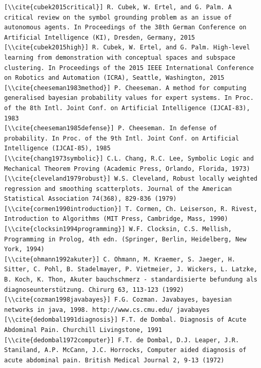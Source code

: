 \documentclass[10pt]{book}
\begin{document}
\begin{verbatim}
[\\cite{cubek2015critical}] R. Cubek, W. Ertel, and G. Palm. A critical review on the symbol grounding problem as an issue of autonomous agents. In Proceedings of the 38th German Conference on Artificial Intelligence (KI), Dresden, Germany, 2015
[\\cite{cubek2015high}] R. Cubek, W. Ertel, and G. Palm. High-level learning from demonstration with conceptual spaces and subspace clustering. In Proceedings of the 2015 IEEE International Conference on Robotics and Automation (ICRA), Seattle, Washington, 2015
[\\cite{cheeseman1983method}] P. Cheeseman. A method for computing generalised bayesian probability values for expert systems. In Proc. of the 8th Intl. Joint Conf. on Artificial Intelligence (IJCAI-83), 1983
[\\cite{cheeseman1985defense}] P. Cheeseman. In defense of probability. In Proc. of the 9th Intl. Joint Conf. on Artificial Intelligence (IJCAI-85), 1985
[\\cite{chang1973symbolic}] C.L. Chang, R.C. Lee, Symbolic Logic and Mechanical Theorem Proving (Academic Press, Orlando, Florida, 1973)
[\\cite{cleveland1979robust}] W.S. Cleveland, Robust locally weighted regression and smoothing scatterplots. Journal of the American Statistical Association 74(368), 829-836 (1979)
[\\cite{cormen1990introduction}] T. Cormen, Ch. Leiserson, R. Rivest, Introduction to Algorithms (MIT Press, Cambridge, Mass, 1990)
[\\cite{clocksin1994programming}] W.F. Clocksin, C.S. Mellish, Programming in Prolog, 4th edn. (Springer, Berlin, Heidelberg, New York, 1994)
[\\cite{ohmann1992akuter}] C. Ohmann, M. Kraemer, S. Jaeger, H. Sitter, C. Pohl, B. Stadelmayer, P. Vietmeier, J. Wickers, L. Latzke, B. Koch, K. Thon, Akuter bauchschmerz - standardisierte befundung als diagnoseunterstützung. Chirurg 63, 113-123 (1992)
[\\cite{cozman1998javabayes}] F.G. Cozman. Javabayes, bayesian networks in java, 1998. http://www.cs.cmu.edu/ javabayes
[\\cite{dedombal1991diagnosis}] F.T. de Dombal. Diagnosis of Acute Abdominal Pain. Churchill Livingstone, 1991
[\\cite{dedombal1972computer}] F.T. de Dombal, D.J. Leaper, J.R. Staniland, A.P. McCann, J.C. Horrocks, Computer aided diagnosis of acute abdominal pain. British Medical Journal 2, 9-13 (1972)

\end{verbatim}
\end{document}
